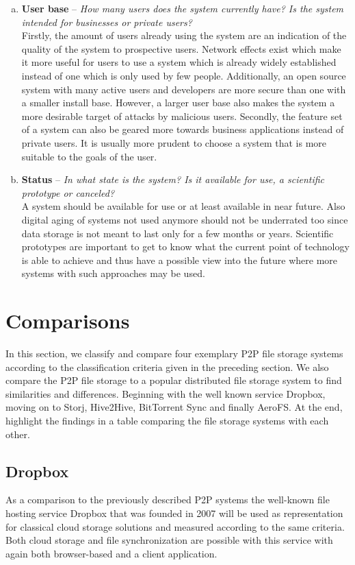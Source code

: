 \begin{enumerate}[(a)]
\item \textbf{User base} -- \textit{How many users does the system currently have? Is the system intended for businesses or private users?}\\
Firstly, the amount of users already using the system are an indication of the quality of the system to prospective users. Network effects exist which make it more useful for users to use a system which is already widely established instead of one which is only used by few people. Additionally, an open source system with many active users and developers are more secure than one with a smaller install base. However, a larger user base also makes the system a more desirable target of attacks by malicious users. Secondly, the feature set of a system can also be geared more towards business applications instead of private users. It is usually more prudent to choose a system that is more suitable to the goals of the user.

\item \textbf{Status} -- \textit{In what state is the system? Is it available for use, a scientific prototype or canceled?}\\
A system should be available for use or at least available in near future. Also digital aging of systems not used anymore should not be underrated too since data storage is not meant to last only for a few months or years. Scientific prototypes are important to get to know what the current point of technology is able to achieve and thus have a possible view into the future where more systems with such approaches may be used.
\end{enumerate}

\section{Comparisons}
\label{comparisons}
In this section, we classify and compare four exemplary P2P file storage systems according to the classification criteria given in the preceding section. We also compare the P2P file storage to a popular distributed file storage system to find similarities and differences. Beginning with the well known service Dropbox, moving on to Storj, Hive2Hive, BitTorrent Sync and finally AeroFS. At the end, highlight the findings in a table comparing the file storage systems with each other.

\subsection{Dropbox}
\label{subsec:dropbox}
As a comparison to the previously described P2P systems the well-known file hosting service Dropbox that was founded in 2007 will be used as representation for classical cloud storage solutions and measured according to the same criteria. Both cloud storage and file synchronization are possible with this service with again both browser-based and a client application.


